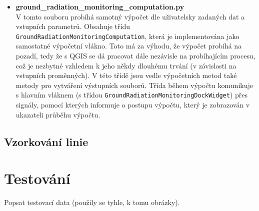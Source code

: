 \begin{itemize}
	\item \textbf{ground\_radiation\_monitoring\_computation.py} \\
		V tomto souboru probíhá samotný výpočet dle uživatelsky zadaných dat a vstupních parametrů. Obsahuje třídu \texttt{GroundRadiationMonitoringComputation}, která je implementována jako samostatné výpočetní vlákno. Toto má za výhodu, že výpočet probíhá na pozadí, tedy že s QGIS se dá pracovat dále nezávisle na probíhajícím procesu, což je nezbytné vzhledem k jeho někdy dlouhému trvání (v závislosti na vstupních proměnných). V této třídě jsou vedle výpočetních metod také metody pro vytváření výstupních souborů. Třída během výpočtu komunikuje s hlavním vláknem (s třídou \texttt{GroundRadiationMonitoringDockWidget}) přes signály, pomocí kterých informuje o postupu výpočtu, který je zobrazován v ukazateli průběhu výpočtu.
	
\end{itemize}

\subsection{Vzorkování linie}


\section{Testování}
Popsat testovací data (použily se tyhle, k tomu obrázky).

